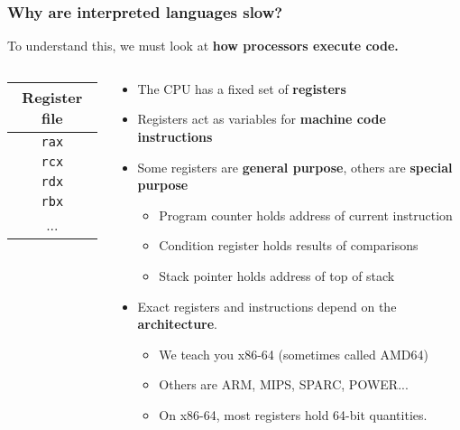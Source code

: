 \documentclass[rgb,dvipsnames,aspectratio=169,xcolor=table]{beamer}
\begin{document}
\begin{frame}
  \frametitle{Why are interpreted languages slow?}

  To understand this, we must look at \textbf{how processors execute code.}

  \bigskip

  \begin{columns}
    \begin{column}{0.2\textwidth}
  \begin{tabular}{|c|}
    \textbf{Register file} \\\hline
    \texttt{rax} \\\hline
    \texttt{rcx} \\\hline
    \texttt{rdx} \\\hline
    \texttt{rbx} \\\hline
    ...
  \end{tabular}
    \end{column}
    \begin{column}{0.8\textwidth}
      \begin{itemize}
      \item The CPU has a fixed set of \textbf{registers}
      \item Registers act as variables for \textbf{machine code instructions}
      \item Some registers are \textbf{general purpose}, others are
        \textbf{special purpose}
        \begin{itemize}
        \item Program counter holds address of current instruction
        \item Condition register holds results of comparisons
        \item Stack pointer holds address of top of stack
        \end{itemize}
      \item Exact registers and instructions depend on the \textbf{architecture}.
        \begin{itemize}
        \item We teach you x86-64 (sometimes called AMD64)
        \item Others are ARM, MIPS, SPARC, POWER...
        \item On x86-64, most registers hold 64-bit quantities.
        \end{itemize}
      \end{itemize}
    \end{column}
  \end{columns}
\end{frame}
\end{document}
